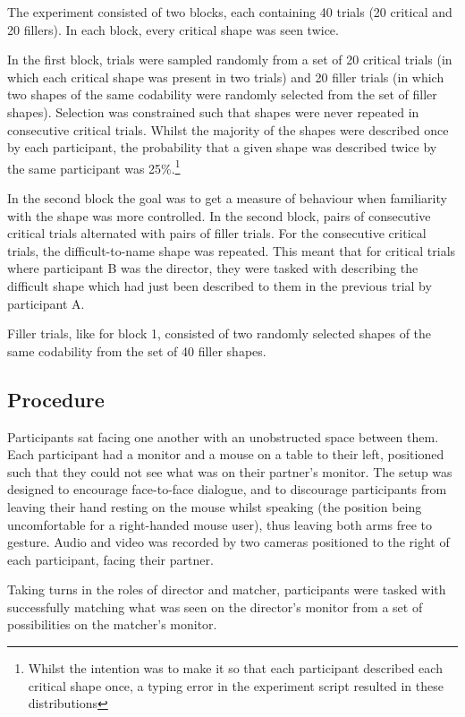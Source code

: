 \documentclass[a4paper,man,natbib]{apa6}
\begin{document}
The experiment consisted of two blocks, each containing 40 trials (20 critical and 20 fillers). 
In each block, every critical shape was seen twice.

In the first block, trials were sampled randomly from a set of 20 critical trials (in which each critical shape was present in two trials) and 20 filler trials (in which two shapes of the same codability were randomly selected from the set of filler shapes). 
Selection was constrained such that shapes were never repeated in consecutive critical trials.
Whilst the majority of the shapes were described once by each participant, the probability that a given shape was described twice by the same participant was 25\%.\footnote{Whilst the intention was to make it so that each participant described each critical shape once, a typing error in the experiment script resulted in these distributions} 

In the second block the goal was to get a measure of behaviour when familiarity with the shape was more controlled. 
In the second block, pairs of consecutive critical trials alternated with pairs of filler trials. 
For the consecutive critical trials, the difficult-to-name shape was repeated.
This meant that for critical trials where participant B was the director, they were tasked with describing the difficult shape which had just been described to them in the previous trial by participant A.

Filler trials, like for block 1, consisted of two randomly selected shapes of the same codability from the set of 40 filler shapes. 


\subsection{Procedure}
Participants sat facing one another with an unobstructed space between them.
Each participant had a monitor and a mouse on a table to their left, positioned such that they could not see what was on their partner's monitor.
The setup was designed to encourage face-to-face dialogue, and to discourage participants from leaving their hand resting on the mouse whilst speaking (the position being uncomfortable for a right-handed mouse user), thus leaving both arms free to gesture.
Audio and video was recorded by two cameras positioned to the right of each participant, facing their partner.

Taking turns in the roles of director and matcher, participants were tasked with successfully matching what was seen on the director's monitor from a set of possibilities on the matcher's monitor.
\end{document}
